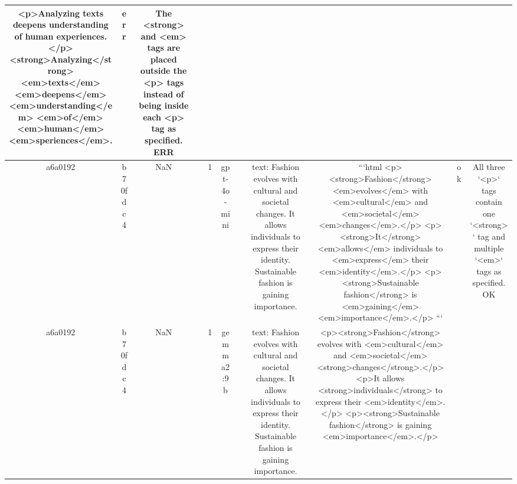 \begin{table}[h!]
\begin{tabular}{|c|c|c|c|c|c|c|c|c|c|c|}
<p>Analyzing texts deepens understanding of human experiences.</p>
<strong>Analyzing</strong> <em>texts</em> <em>deepens</em> <em>understanding</em> <em>of</em><em>human</em> <em>speriences</em>. & err & The <strong> and <em> tags are placed outside the <p> tags instead of being inside each <p> tag as specified.
ERR\\
\hline
a6a0192 & b70fdc4 & NaN &  & 1 & gpt-4o-mini &  & text: Fashion evolves with cultural and societal changes. It allows individuals to express their identity. Sustainable fashion is gaining importance. & ```html
<p><strong>Fashion</strong> <em>evolves</em> with <em>cultural</em> and <em>societal</em> <em>changes</em>.</p>
<p><strong>It</strong> <em>allows</em> individuals to <em>express</em> their <em>identity</em>.</p>
<p><strong>Sustainable fashion</strong> is <em>gaining</em> <em>importance</em>.</p>
``` & ok & All three `<p>` tags contain one `<strong>` tag and multiple `<em>` tags as specified.
OK\\
\hline
a6a0192 & b70fdc4 & NaN &  & 1 & gemma2:9b &  & text: Fashion evolves with cultural and societal changes. It allows individuals to express their identity. Sustainable fashion is gaining importance. & <p><strong>Fashion</strong> evolves with <em>cultural</em> and <em>societal</em> <strong>changes</strong>.</p>
<p>It allows <strong>individuals</strong> to express their <em>identity</em>.</p>
<p><strong>Sustainable fashion</strong> is gaining <em>importance</em>.</p> 



\end{tabular}
\end{table}
